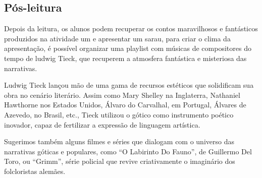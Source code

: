 \documentclass[11pt]{extarticle}
\begin{document}

\subsection{Pós-leitura}


Depois da leitura, os alunos podem recuperar os contos
maravilhosos e fantásticos produzidos na atividade um e apresentar um
sarau, para criar o clima da apresentação, é possível organizar uma
playlist com músicas de compositores do tempo de ludwig Tieck, que
recuperem a atmosfera fantástica e misteriosa das narrativas.

Ludwig Tieck lançou mão de uma gama de recursos estéticos que
solidificam sua obra no cenário literário. Assim como Mary Shelley na
Inglaterra, Nathaniel Hawthorne nos Estados Unidos, Álvaro do Carvalhal,
em Portugal, Álvares de Azevedo, no Brasil, etc., Tieck utilizou o
gótico como instrumento poético inovador, capaz de fertilizar a
expressão de linguagem artística.

Sugerimos também alguns filmes e séries que dialogam com o universo das
narrativas góticas e populares, como ``O Labirinto Do Fauno'', de
Guillermo Del Toro, ou ``Grimm'', série policial que revive
criativamente o imaginário dos folcloristas alemães.
\end{document}
